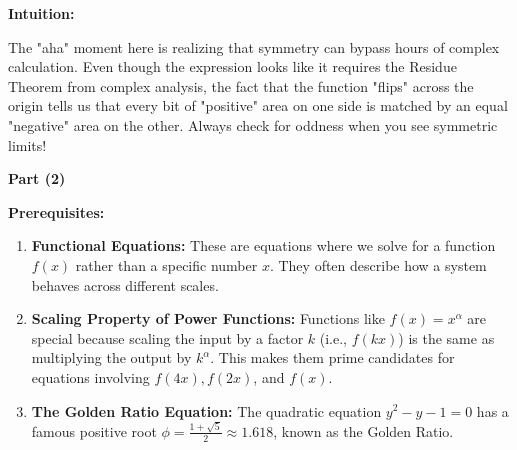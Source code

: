 \begin{solution}
\textbf{Intuition:}

The "aha" moment here is realizing that symmetry can bypass hours of complex calculation. Even though the expression looks like it requires the Residue Theorem from complex analysis, the fact that the function "flips" across the origin tells us that every bit of "positive" area on one side is matched by an equal "negative" area on the other. Always check for oddness when you see symmetric limits!


\vspace{2em}


\textbf{Part (2)}

\textbf{Prerequisites:}
\begin{enumerate}
    \item \textbf{Functional Equations:} These are equations where we solve for a function $f(x)$ rather than a specific number $x$. They often describe how a system behaves across different scales.
    \item \textbf{Scaling Property of Power Functions:} Functions like $f(x) = x^\alpha$ are special because scaling the input by a factor $k$ (i.e., $f(kx)$) is the same as multiplying the output by $k^\alpha$. This makes them prime candidates for equations involving $f(4x), f(2x)$, and $f(x)$.
    \item \textbf{The Golden Ratio Equation:} The quadratic equation $y^2 - y - 1 = 0$ has a famous positive root $\phi = \frac{1+\sqrt{5}}{2} \approx 1.618$, known as the Golden Ratio.
\end{enumerate}


\end{solution}
